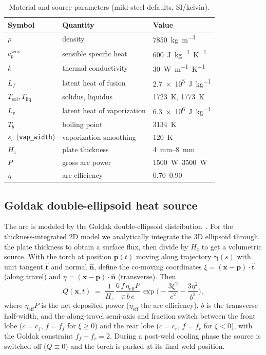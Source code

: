 \documentclass[11pt]{article}
\newcommand{\cpsens}{c_p^{\mathrm{sens}}}
\theoremstyle{definition}
\begin{document}
\begin{table}[t]
\centering
\caption{Material and source parameters (mild-steel defaults, SI/kelvin).}
\label{tab:material}
\small
\begin{tabular}{lll}
\toprule
Symbol & Quantity & Value \\
\midrule
$\rho$              & density                       & \SI{7850}{kg.m^{-3}} \\
$\cpsens$           & sensible specific heat        & \SI{600}{J.kg^{-1}.K^{-1}} \\
$k$                 & thermal conductivity          & \SI{30}{W.m^{-1}.K^{-1}} \\
$L_f$               & latent heat of fusion         & \SI{2.7e5}{J.kg^{-1}} \\
$T_{\mathrm{sol}},T_{\mathrm{liq}}$ & solidus, liquidus & \SI{1723}{K}, \SI{1773}{K} \\
$L_v$               & latent heat of vaporization   & \SI{6.3e6}{J.kg^{-1}} \\
$T_b$               & boiling point                 & \SI{3134}{K} \\
$s_v$ (\texttt{vap\_width}) & vaporization smoothing & \SI{120}{K} \\
$H_{\!z}$           & plate thickness               & \SIrange{4}{8}{mm} \\
$P$                 & gross arc power               & \SIrange{1500}{3500}{W} \\
$\eta$              & arc efficiency                & \numrange{0.70}{0.90} \\
\bottomrule
\end{tabular}
\end{table}

\subsection{Goldak double-ellipsoid heat source}

The arc is modeled by the Goldak double-ellipsoid distribution~\cite{goldak1984new}.
For the thickness-integrated 2D model we analytically integrate the 3D ellipsoid
through the plate thickness to obtain a surface flux, then divide by $H_{\!z}$ to get
a volumetric source. With the torch at position $\bm{p}(t)$ moving along trajectory
$\bm\gamma(s)$ with unit tangent $\hat{\bm t}$ and normal $\hat{\bm n}$, define the
co-moving coordinates $\xi=(\bm x-\bm p)\cdot\hat{\bm t}$ (along travel) and
$\eta=(\bm x-\bm p)\cdot\hat{\bm n}$ (transverse). Then
\begin{equation}
  Q(\bm x,t) \;=\; \frac{1}{H_{\!z}}\,
  \frac{6\,f\,\eta_{\mathrm{eff}}P}{\pi\,b\,c}\,
  \exp\!\Big(-\frac{3\xi^2}{c^2}-\frac{3\eta^2}{b^2}\Big),
  \label{eq:goldak}
\end{equation}
where $\eta_{\mathrm{eff}}P$ is the net deposited power ($\eta_{\mathrm{eff}}$ the
arc efficiency), $b$ is the transverse half-width, and the along-travel semi-axis and
fraction switch between the front lobe ($c=c_f$, $f=f_f$ for $\xi\ge0$) and the rear
lobe ($c=c_r$, $f=f_r$ for $\xi<0$), with the Goldak constraint $f_f+f_r=2$. During a
post-weld cooling phase the source is switched off ($Q\equiv0$) and the torch is
parked at its final weld position.
\end{document}
